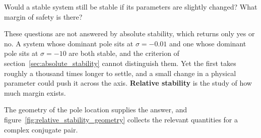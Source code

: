 \documentclass[12pt,letter]{article}
\begin{document}
Would a stable system still be stable if its parameters are slightly changed? What margin of safety is there?

These questions are not answered by absolute stability, which returns only yes or no. A system whose dominant pole sits at $\sigma = -0.01$ and one whose dominant pole sits at $\sigma = -10$ are both stable, and the criterion of section~\ref{sec:absolute_stability} cannot distinguish them. Yet the first takes roughly a thousand times longer to settle, and a small change in a physical parameter could push it across the axis. \textbf{Relative stability} is the study of how much margin exists.

The geometry of the pole location supplies the answer, and figure~\ref{fig:relative_stability_geometry} collects the relevant quantities for a complex conjugate pair.
\end{document}
